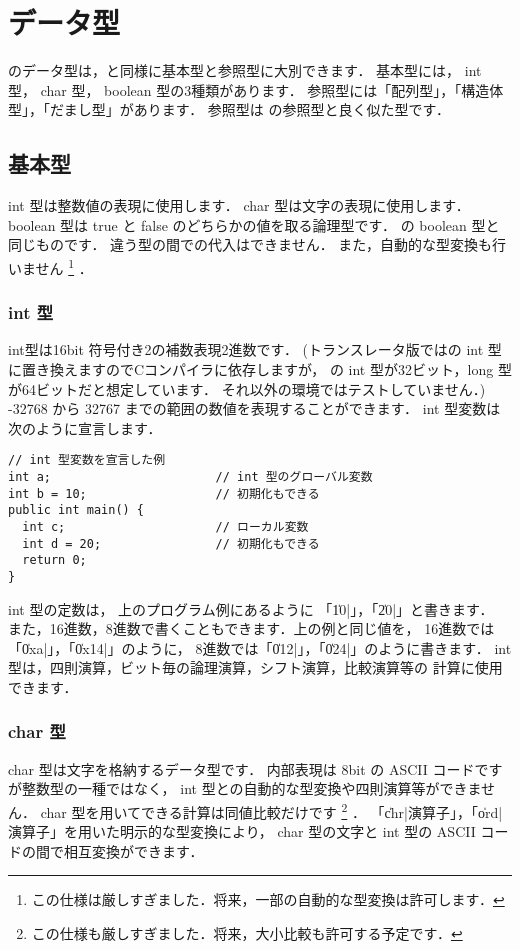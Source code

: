 \section{データ型}

\cmml のデータ型は，\javal と同様に基本型と参照型に大別できます．
基本型には， int 型， char 型， boolean 型の3種類があります．
参照型には「配列型」，「構造体型」，「だまし型」があります．
参照型は \javal の参照型と良く似た型です．

\subsection{基本型}

int 型は整数値の表現に使用します．
char 型は文字の表現に使用します．
boolean 型は true と false のどちらかの値を取る論理型です．
\javal の boolean 型と同じものです．
違う型の間での代入はできません．
また，自動的な型変換も行いません
\footnote{この仕様は厳しすぎました．将来，一部の自動的な型変換は許可します．}
．

\subsubsection{int 型}
int型は16bit 符号付き2の補数表現2進数です．
(トランスレータ版では\cl の int 型に置き換えますのでCコンパイラに依存しますが，
{\cl}の int 型が32ビット，long 型が64ビットだと想定しています．
それ以外の環境ではテストしていません．)
-32768 から 32767 までの範囲の数値を表現することができます．
int 型変数は次のように宣言します．

\begin{mylist}
\begin{verbatim}
// int 型変数を宣言した例
int a;                       // int 型のグローバル変数
int b = 10;                  // 初期化もできる
public int main() {
  int c;                     // ローカル変数
  int d = 20;                // 初期化もできる
  return 0;
}
\end{verbatim}
\end{mylist}

int 型の定数は，
上のプログラム例にあるように 「\|10|」，「\|20|」と書きます．
また，16進数，8進数で書くこともできます．上の例と同じ値を，
16進数では「\|0xa|」，「\|0x14|」のように，
8進数では「\|012|」，「\|024|」のように書きます．
int 型は，四則演算，ビット毎の論理演算，シフト演算，比較演算等の
計算に使用できます．

\subsubsection{char 型}
char 型は文字を格納するデータ型です．
内部表現は 8bit の ASCII コードですが整数型の一種ではなく，
int 型との自動的な型変換や四則演算等ができません．
char 型を用いてできる計算は同値比較だけです
\footnote{この仕様も厳しすぎました．将来，大小比較も許可する予定です．}
．
「\|chr|演算子」，「\|ord|演算子」を用いた明示的な型変換により，
char 型の文字と int 型の ASCII コードの間で相互変換ができます．

